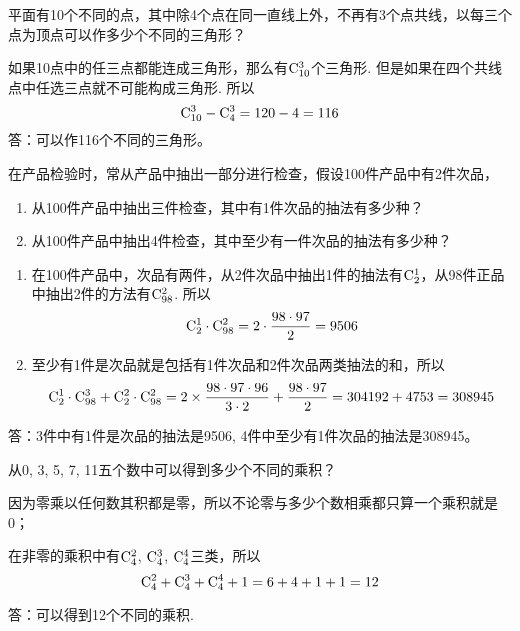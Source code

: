 \begin{example}
    平面有10个不同的点，其中除4个点在同一直线上外，不再有3个点共线，以每三个点为顶点可以作多少个不同的三角形？
\end{example}


\begin{solution}
    如果10点中的任三点都能连成三角形，那么有${\rm C}^{3}_{10}$个三角形. 但是如果在四个共线点中任选三点就不可能构成三角形. 所以
\[{\rm C}^{3}_{10}-{\rm C}^{3}_{4}=120-4=116\]
答：可以作116个不同的三角形。
\end{solution}



\begin{example}
    在产品检验时，常从产品中抽出一部分进行检查，假设100件产品中有2件次品，
    \begin{enumerate}[(1)]
        \item 从100件产品中抽出三件检查，其中有1件次品的抽法有多少种？
        \item 从100件产品中抽出4件检查，其中至少有一件次品的抽法有多少种？
    \end{enumerate}
\end{example}

\begin{solution}
\begin{enumerate}[(1)]
    \item 在100件产品中，次品有两件，从2件次品中抽出1件的抽法有${\rm C}^{1}_{2}$，从98件正品中抽出2件的方法有${\rm C}^{2}_{98}$. 所以
\[{\rm C}^{1}_{2}\cdot {\rm C}^{2}_{98}=2\cdot \dfrac{98\cdot 97}{2}=9506\]
    \item 至少有1件是次品就是包括有1件次品和2件次品两类抽法的和，所以 
\[{\rm C}^{1}_{2}\cdot {\rm C}^{3}_{98}+{\rm C}^{2}_{2}\cdot {\rm C}^{2}_{98}=2\times \dfrac{98\cdot 97\cdot 96}{3\cdot 2}+\dfrac{98\cdot 97}{2}=304192+4753=308945\]
\end{enumerate}
答：3件中有1件是次品的抽法是9506, 4件中至少有1件次品的抽法是308945。
\end{solution}

\begin{example}
    从0, 3, 5, 7, 11五个数中可以得到多少个不同的乘积？
\end{example}

\begin{solution}
    因为零乘以任何数其积都是零，所以不论零与多少个数相乘都只算一个乘积就是0；

在非零的乘积中有${\rm C}^{2}_{4}$, ${\rm C}^{3}_{4}$, ${\rm C}^{4}_{4}$三类，所以
\[{\rm C}^{2}_{4}+{\rm C}^{3}_{4}+{\rm C}^{4}_{4}+1=6+4+1+1=12\]

答：可以得到12个不同的乘积.
\end{solution}

